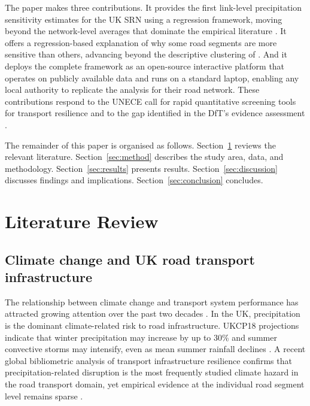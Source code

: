 \documentclass[review]{elsarticle}
\begin{document}
The paper makes three contributions. It provides the first link-level precipitation sensitivity estimates for the UK SRN using a regression framework, moving beyond the network-level averages that dominate the empirical literature \citep{hranac2006empirical,koetse2009impact}. It offers a regression-based explanation of why some road segments are more sensitive than others, advancing beyond the descriptive clustering of \citet{gao2024resilience}. And it deploys the complete framework as an open-source interactive platform that operates on publicly available data and runs on a standard laptop, enabling any local authority to replicate the analysis for their road network. These contributions respond to the UNECE call for rapid quantitative screening tools for transport resilience \citep{unece2024stress} and to the gap identified in the DfT's evidence assessment \citep{dft2024rea}.

The remainder of this paper is organised as follows. Section~\ref{sec:lit} reviews the relevant literature. Section~\ref{sec:method} describes the study area, data, and methodology. Section~\ref{sec:results} presents results. Section~\ref{sec:discussion} discusses findings and implications. Section~\ref{sec:conclusion} concludes.


\section{Literature Review}
\label{sec:lit}

\subsection{Climate change and UK road transport infrastructure}
\label{sec:lit:climate}

The relationship between climate change and transport system performance has attracted growing attention over the past two decades \citep{koetse2009impact,jaroszweski2010effect,stern2007contribution}. In the UK, precipitation is the dominant climate-related risk to road infrastructure. UKCP18 projections indicate that winter precipitation may increase by up to 30\% and summer convective storms may intensify, even as mean summer rainfall declines \citep{ukcp18}. A recent global bibliometric analysis of transport infrastructure resilience confirms that precipitation-related disruption is the most frequently studied climate hazard in the road transport domain, yet empirical evidence at the individual road segment level remains sparse \citep{zhou2026bibliometric}.
\end{document}
